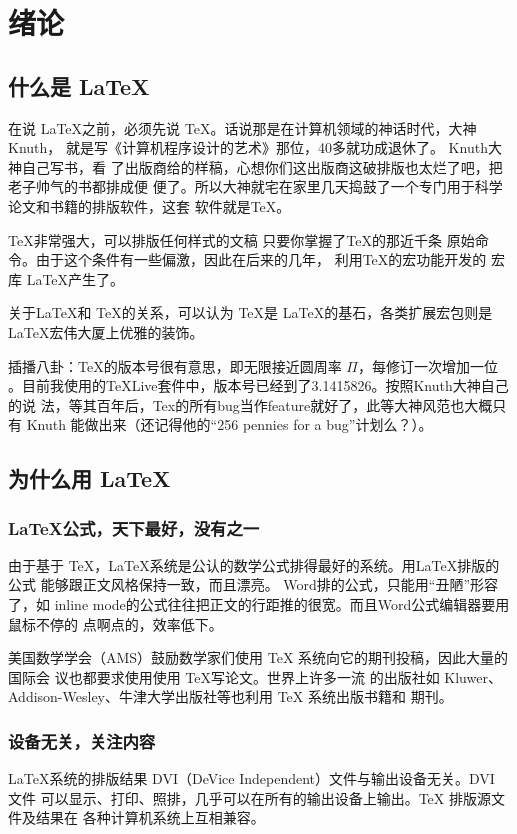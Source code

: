 \chapter{绪论}
\label{cha:intro}
\section{什么是 \LaTeX }
在说 \LaTeX \cite{companion}之前，必须先说 \TeX \cite{tex}。话说那是在计算机领域的神话时代，大神Knuth，
就是写《计算机程序设计的艺术》那位，40多就功成退休了。 Knuth大神自己写书，看
了出版商给的样稿，心想你们这出版商这破排版也太烂了吧，把老子帅气的书都排成便
便了。所以大神就宅在家里几天捣鼓了一个专门用于科学论文和书籍的排版软件，这套
软件就是\TeX。

\TeX 非常强大，可以排版任何样式的文稿 \pozhehao 只要你掌握了\TeX 的那近千条
原始命令。由于这个条件有一些偏激，因此在后来的几年， 利用\TeX 的宏功能开发的
宏库 \LaTeX 产生了。

关于\LaTeX 和 \TeX 的关系，可以认为 \TeX 是 \LaTeX 的基石，各类扩展宏包则是
\LaTeX 宏伟大厦上优雅的装饰。

插播八卦：\TeX 的版本号很有意思，即无限接近圆周率 $\Pi$，每修订一次增加一位
。目前我使用的TeXLive套件中，版本号已经到了3.1415826。按照Knuth大神自己的说
法，等其百年后，Tex的所有bug当作feature就好了，此等大神风范也大概只有 Knuth
能做出来（还记得他的“256 pennies for a bug”计划么？）。

\section{为什么用 \LaTeX }
\subsection{\LaTeX 公式，天下最好，没有之一}
\label{subsec:best-formula}
由于基于 \TeX ，\LaTeX 系统是公认的数学公式排得最好的系统。用LaTeX排版的公式
能够跟正文风格保持一致，而且漂亮。 Word排的公式，只能用“丑陋”形容了，如
inline mode的公式往往把正文的行距推的很宽。而且Word公式编辑器要用鼠标不停的
点啊点的，效率低下。

美国数学学会（AMS）鼓励数学家们使用 TeX 系统向它的期刊投稿，因此大量的国际会
议也都要求使用使用 TeX写论文\cite{acm-proceedings-templates}。世界上许多一流
的出版社如 Kluwer、Addison-Wesley、牛津大学出版社等也利用 TeX 系统出版书籍和
期刊。

\subsection{设备无关，关注内容} 
\LaTeX 系统的排版结果 DVI（DeVice Independent）文件与输出设备无关。DVI 文件
可以显示、打印、照排，几乎可以在所有的输出设备上输出。TeX 排版源文件及结果在
各种计算机系统上互相兼容。

